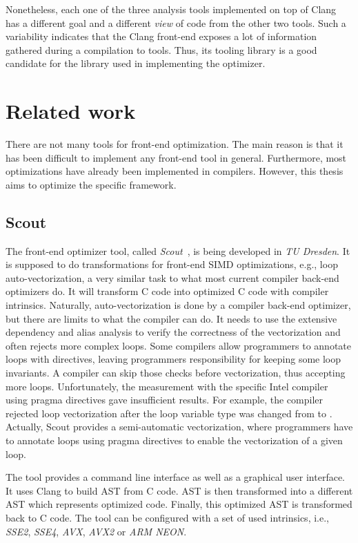 Nonetheless, each one of the three analysis tools implemented on top of Clang has a different goal and a different \textit{view} of code from the other two tools. Such a variability indicates that the Clang front-end exposes a lot of information gathered during a compilation to tools. Thus, its tooling library is a good candidate for the library used in implementing the optimizer.

\section{Related work}
There are not many tools for front-end optimization. The main reason is that it has been difficult to implement any front-end tool in general. Furthermore, most optimizations have already been implemented in compilers. However, this thesis aims to optimize the specific framework.

\subsection{Scout}
\label{scout}
The front-end optimizer tool, called \emph{Scout}~\cite{scout}, is being developed in \emph{TU Dresden}. It is supposed to do transformations for front-end SIMD optimizations, e.g., loop auto-vectorization, a very similar task to what most current compiler back-end optimizers do. It will transform C code into optimized C code with compiler intrinsics. Naturally, auto-vectorization is done by a compiler back-end optimizer, but there are limits to what the compiler can do. It needs to use the extensive dependency and alias analysis to verify the correctness of the vectorization and often rejects more complex loops. Some compilers allow programmers to annotate loops with  directives, leaving programmers responsibility for keeping some loop invariants. A compiler can skip those checks before vectorization, thus accepting more loops. Unfortunately, the measurement with the specific Intel compiler using pragma directives gave insufficient results. For example, the compiler rejected loop vectorization after the loop variable type was changed from  to . Actually, Scout provides a semi-automatic vectorization, where programmers have to annotate loops using pragma directives to enable the vectorization of a given loop.

The tool provides a command line interface as well as a graphical user interface. It uses Clang to build AST from C code. AST is then transformed into a different AST which represents optimized code. Finally, this optimized AST is transformed back to C code. The tool can be configured with a set of used intrinsics, i.e., \emph{SSE2}, \emph{SSE4}, \emph{AVX}, \emph{AVX2} or \emph{ARM NEON}.

